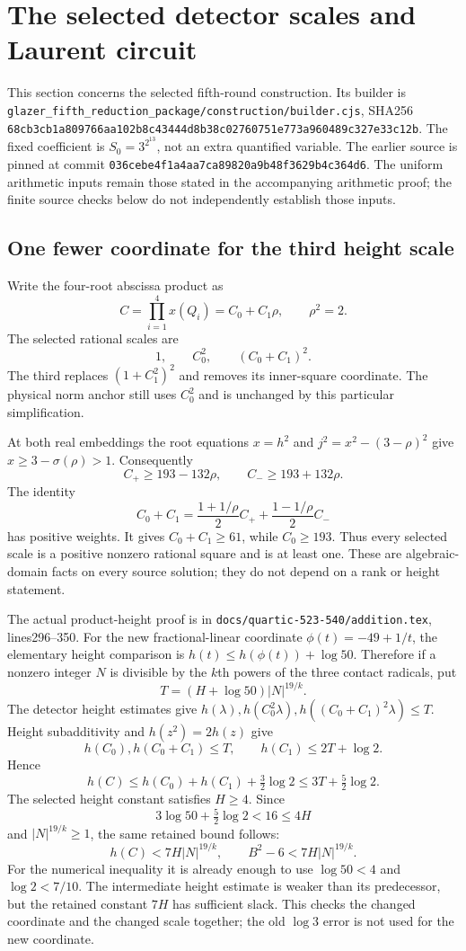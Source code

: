 \section{The selected detector scales and Laurent circuit}

This section concerns the selected fifth-round construction. Its builder is
\texttt{glazer\_fifth\_reduction\_package/construction/builder.cjs}, SHA256
\texttt{68cb3cb1a809766aa102b8c43444d8b38c02760751e773a960489c327e33c12b}.
The fixed coefficient is $S_0=3^{2^{13}}$, not an extra quantified variable.
The earlier source is pinned at commit
\texttt{036cebe4f1a4aa7ca89820a9b48f3629b4c364d6}.
The uniform arithmetic inputs remain those stated in the accompanying
arithmetic proof; the finite source checks below do not independently
establish those inputs.

\subsection{One fewer coordinate for the third height scale}

Write the four-root abscissa product as
\[
 C=\prod_{i=1}^4x(Q_i)=C_0+C_1\rho,\qquad\rho^2=2.
\]
The selected rational scales are
\[
 1,\qquad C_0^2,\qquad(C_0+C_1)^2.
\]
The third replaces $(1+C_1^2)^2$ and removes its inner-square coordinate.
The physical norm anchor still uses $C_0^2$ and is unchanged by this
particular simplification.

At both real embeddings the root equations $x=h^2$ and
$j^2=x^2-(3-\rho)^2$ give $x\ge3-\sigma(\rho)>1$. Consequently
\[
 C_+\ge193-132\rho,\qquad C_-\ge193+132\rho.
\]
The identity
\[
 C_0+C_1=\frac{1+1/\rho}{2}C_+
         +\frac{1-1/\rho}{2}C_-
\]
has positive weights. It gives $C_0+C_1\ge61$, while $C_0\ge193$.
Thus every selected scale is a positive nonzero rational square and is
at least one. These are algebraic-domain facts on every source solution;
they do not depend on a rank or height statement.

The actual product-height proof is in
\texttt{docs/quartic-523-540/addition.tex}, lines296--350. For the new
fractional-linear coordinate $\phi(t)=-49+1/t$, the elementary height
comparison is $h(t)\le h(\phi(t))+\log50$. Therefore if a nonzero integer
$N$ is divisible by the $k$th powers of the three contact radicals, put
\[
 T=(H+\log50)|N|^{19/k}.
\]
The detector height estimates give
$h(\lambda),h(C_0^2\lambda),h((C_0+C_1)^2\lambda)\le T$.
Height subadditivity and $h(z^2)=2h(z)$ give
\[
 h(C_0),h(C_0+C_1)\le T,\qquad
 h(C_1)\le2T+\log2.
\]
Hence
\[
 h(C)\le h(C_0)+h(C_1)+\tfrac32\log2
       \le3T+\tfrac52\log2.
\]
The selected height constant satisfies $H\ge4$. Since
\[
 3\log50+\tfrac52\log2<16\le4H
\]
and $|N|^{19/k}\ge1$, the same retained bound follows:
\[
 h(C)<7H|N|^{19/k},\qquad B^2-6<7H|N|^{19/k}.
\]
For the numerical inequality it is already enough to use
$\log50<4$ and $\log2<7/10$. The intermediate height estimate is weaker
than its predecessor, but the retained constant $7H$ has sufficient slack.
This checks the changed coordinate and the changed scale together; the
old $\log3$ error is not used for the new coordinate.

